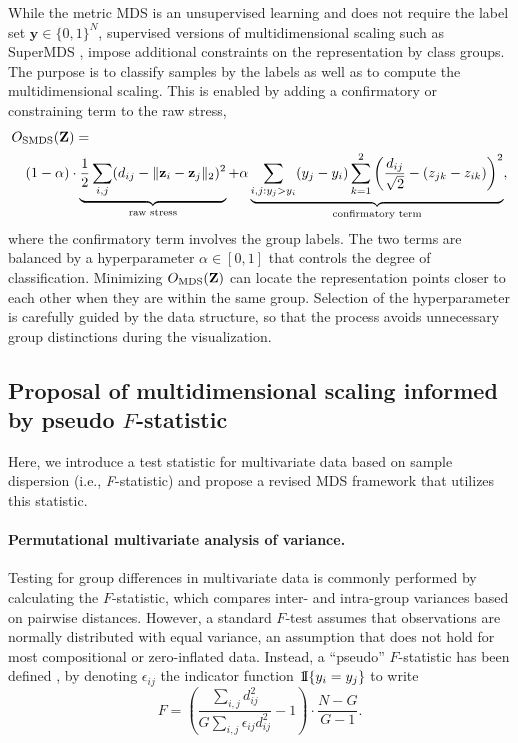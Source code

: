 \documentclass[10pt,letterpaper]{article}
\newcommand{\1}{{\rm 1}\kern-0.24em{\rm I}}
\begin{document}
While the metric MDS is an unsupervised learning and does not require the label set $\mathbf{y}\in\{0,1\}^N$, supervised versions of multidimensional scaling such as SuperMDS \cite{witten11}, impose additional constraints on the representation by class groups.
The purpose is to classify samples by the labels as well as to compute the multidimensional scaling.
This is enabled by adding a confirmatory or constraining term to the raw stress, 
\begin{equation}
\begin{split}
&O_{\rm SMDS}(\mathbf{Z}) = \\
&\quad (1-\alpha)\cdot \underbrace{\frac{1}{2}\sum_{i,j} (d_{ij} - \| \mathbf{z}_i - \mathbf{z}_j \|_2 )^2}_\text{raw stress} + 
\alpha \underbrace{\sum_{i,j:y_{j}>y_{i}} (y_j - y_i) \sum_{k=1}^2 \left(\frac{d_{ij}}{\sqrt{2}}-(z_{jk} - z_{ik})\right)^2}_\text{confirmatory term},
\end{split}
\end{equation}
where the confirmatory term involves the group labels.
The two terms are balanced by a hyperparameter $\alpha \in [0,1]$ that controls the degree of classification.  
Minimizing $O_{\rm MDS}(\mathbf{Z})$ can locate the representation points closer to each other when they are within the same group.
Selection of the hyperparameter is carefully guided by the data structure, so that the process avoids unnecessary group distinctions during the visualization.


\subsection*{Proposal of multidimensional scaling informed by pseudo $F$-statistic}
Here, we introduce a test statistic for multivariate data based on sample dispersion (i.e., \textit{F}-statistic) and propose a revised MDS framework that utilizes this statistic.

\paragraph*{Permutational multivariate analysis of variance.}
Testing for group differences in multivariate data is commonly performed by calculating the $F$-statistic, which compares inter- and intra-group variances based on pairwise distances.
However, a standard $F$-test assumes that observations are normally distributed with equal variance, an assumption that does not hold for most compositional or zero-inflated data.
Instead, a ``pseudo'' $F$-statistic has been defined \cite{clarke93}, by denoting $\epsilon_{ij}$ the indicator function $\1\{y_i=y_j\}$ to write
\begin{equation} \label{eq:pseudof}
F = \left(\frac{\sum_{i,j}d_{ij}^2}{G\sum_{i,j}\epsilon_{ij}d_{ij}^2}-1\right)\cdot \frac{N-G}{G-1}.
\end{equation} 
\end{document}
